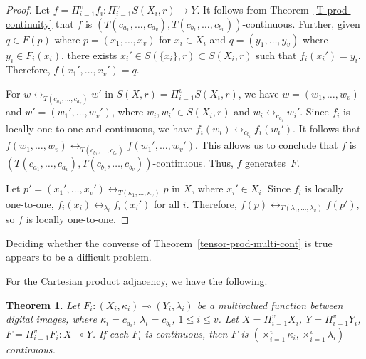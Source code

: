 \documentclass{article}
\theoremstyle{plain}
\newtheorem{thm}{Theorem}
\theoremstyle{definition}
\numberwithin{thm}{section}
\newcommand{\adj}{\leftrightarrow}
\begin{document}
\begin{proof}
Let $f = \Pi_{i=1}^v f_i: \Pi_{i=1}^v S(X_i,r) \to Y$. It follows from
Theorem~\ref{T-prod-continuity} that
$f$ is $(T(c_{a_1},\ldots,c_{a_v}),T(c_{b_1},\ldots,c_{b_v}))$-continuous.
Further, given $q \in F(p)$
where $p=(x_1,\ldots, x_v)$ for
$x_i \in X_i$ and $q=(y_1,\ldots,y_v)$ where $y_i \in F_i(x_i)$, there exists
$x_i' \in S(\{x_i\},r) \subset S(X_i,r)$ such that $f_i(x_i')=y_i$.
Therefore, $f(x_1',\ldots,x_v')=q$.

For $w \adj_{T(c_{a_1},\ldots,c_{a_v})} w'$ in $S(X,r)=\Pi_{i=1}^v S(X_i,r)$, we
have $w=(w_1,\ldots,w_v)$ and
$w'=(w_1',\ldots,w_v')$,
where $w_i,w_i' \in S(X_i,r)$ and
$w_i \adj_{c_{a_i}} w_i'$. Since $f_i$ is locally
one-to-one and continuous, we have
$f_i(w_i) \adj_{c_{b_i}} f_i(w_i')$.
It follows that $f(w_1,\ldots,w_v) \adj_{T(c_{b_1},\ldots,c_{b_v})}
f(w_1', \ldots, w_v')$.
This allows us to conclude that $f$ is
$(T(c_{a_1},\ldots,c_{a_v}),T(c_{b_1},\ldots,c_{b_v}))$-continuous.
Thus, $f$ generates~$F$.

Let $p'=(x_1',\ldots,x_v') \adj_{T(\kappa_1,\ldots,\kappa_v)} p$ in $X$, where $x_i' \in X_i$.
Since $f_i$ is locally one-to-one,
$f_i(x_i) \adj_{\lambda_i} f_i(x_i')$ for all $i$. Therefore,
$f(p) \adj_{T(\lambda_1,\ldots,\lambda_v)} f(p')$, so $f$ is
locally one-to-one.
\end{proof}

Deciding whether the converse of
Theorem~\ref{tensor-prod-multi-cont} is true appears
to be a difficult problem.

For the Cartesian product adjacency, we have the following.

\begin{thm}
\label{tensor-factor-cont-implies-prod}
Let $F_i: (X_i,\kappa_i) \multimap (Y_i,\lambda_i)$ be a
multivalued function between digital images, where $\kappa_i=c_{a_i}$, $\lambda_i=c_{b_i}$, $1 \le i \le v$.
Let $X = \Pi_{i=1}^v X_i$,
$Y = \Pi_{i=1}^v Y_i$,
$F = \Pi_{i=1}^v F_i: X \multimap Y$. If each $F_i$ is continuous, then $F$ is $(\times_{i=1}^v \kappa_i,\times_{i=1}^v \lambda_i)$-continuous.
\end{thm}
\end{document}
